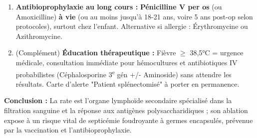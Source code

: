 \documentclass[11pt]{article}
\begin{document}
\begin{exoresolu}
\begin{enumerate}
\begin{enumerate}
\begin{itemize}
                    \item Vaccin anti-\emph{Haemophilus influenzae} type b (Hib).
                    \item Vaccin anti-méningococcique tétravalent conjugué (ACYW135) + sérogroupe B.
                    \item \emph{Note :} Au Cameroun, le PCV et Hib font partie du PEV (Programme Élargi de Vaccination), le méningocoque est recommandé en zone de méningite (Nord).
                \end{itemize}
            \item \textbf{Antibioprophylaxie au long cours :} \textbf{Pénicilline V per os} (ou Amoxicilline) \textbf{à vie} (ou au moins jusqu'à 18-21 ans, voire 5 ans post-op selon protocoles), surtout chez l'enfant. Alternative si allergie : Érythromycine ou Azithromycine.
            \item (Complément) \textbf{Éducation thérapeutique :} Fièvre $\geq$ 38,5°C = urgence médicale, consultation immédiate pour hémocultures et antibiotiques IV probabilistes (Céphalosporine 3\textsuperscript{e} gén +/- Aminoside) sans attendre les résultats. Carte d'alerte "Patient splénectomisé" à porter en permanence.
        \end{enumerate}
    \end{enumerate}
    \textbf{Conclusion :} La rate est l'organe lymphoïde secondaire spécialisé dans la filtration sanguine et la réponse aux antigènes polysaccharidiques ; son ablation expose à un risque vital de septicémie foudroyante à germes encapsulés, prévenue par la vaccination et l'antibioprophylaxie.
\end{exoresolu}
\end{document}

